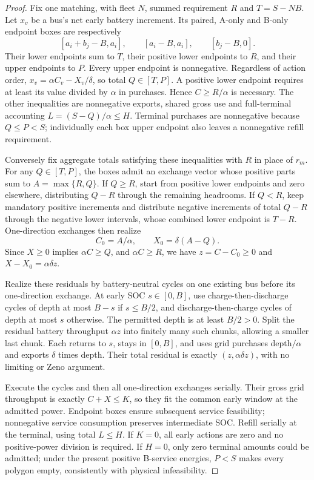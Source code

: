 \begin{proof}
Fix one matching, with fleet $N$, summed requirement $R$ and
$T=S-NB$. Let $x_v$ be a bus's net early battery increment.
Its paired, A-only and B-only endpoint boxes are respectively
\[
 [a_i+b_j-B,a_i],\qquad[a_i-B,a_i],\qquad[b_j-B,0].
\]
Their lower endpoints sum to $T$, their positive lower endpoints to $R$,
and their upper endpoints to $P$. Every upper endpoint is nonnegative.
Regardless of action order, $x_v=\alpha C_v-X_v/\delta$, so total
$Q\in[T,P]$. A positive lower endpoint requires at least its value
divided by $\alpha$ in purchases. Hence $C\ge R/\alpha$ is necessary.
The other inequalities are nonnegative exports, shared gross use and
full-terminal accounting $L=(S-Q)/\alpha\le H$. Terminal purchases are
nonnegative because $Q\le P<S$; individually each box upper endpoint
also leaves a nonnegative refill requirement.

Conversely fix aggregate totals satisfying these inequalities with $R$
in place of $r_m$. For any $Q\in[T,P]$, the boxes admit an exchange
vector whose positive parts sum to $A=\max\{R,Q\}$. If $Q\ge R$,
start from positive lower endpoints and zero elsewhere, distributing
$Q-R$ through the remaining headrooms. If $Q<R$, keep mandatory positive
increments and distribute negative increments of total $Q-R$ through the
negative lower intervals, whose combined lower endpoint is $T-R$.
One-direction exchanges then realize
\[
 C_0=A/\alpha,\qquad X_0=\delta(A-Q).
\]
Since $X\ge0$ implies $\alpha C\ge Q$, and
$\alpha C\ge R$, we have $z=C-C_0\ge0$ and
$X-X_0=\alpha\delta z$.

Realize these residuals by battery-neutral cycles on one existing bus
before its one-direction exchange. At early SOC $s\in[0,B]$, use
charge-then-discharge cycles of depth at most $B-s$ if $s\le B/2$,
and discharge-then-charge cycles of depth at most $s$ otherwise.
The permitted depth is at least $B/2>0$. Split the residual battery
throughput $\alpha z$ into finitely many such chunks, allowing a smaller
last chunk. Each returns to $s$, stays in $[0,B]$, and uses grid purchases
depth$/\alpha$ and exports $\delta$ times depth. Their total residual
is exactly $(z,\alpha\delta z)$, with no limiting or Zeno argument.

Execute the cycles and then all one-direction exchanges serially.
Their gross grid throughput is exactly $C+X\le K$, so they fit the
common early window at the admitted power. Endpoint boxes ensure
subsequent service feasibility; nonnegative service consumption preserves
intermediate SOC. Refill serially at the terminal, using total
$L\le H$. If $K=0$, all early actions are zero and no positive-power
division is required. If $H=0$, only zero terminal amounts could be
admitted; under the present positive B-service energies, $P<S$ makes
every polygon empty, consistently with physical infeasibility.


\end{proof}
